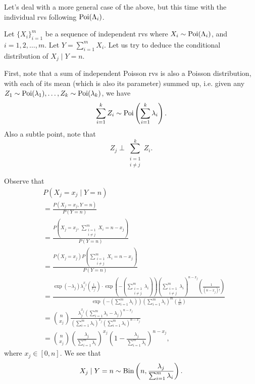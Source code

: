 \documentclass[notoc,notitlepage]{tufte-book}
\begin{document}
Let's deal with a more general case of the above, but this time with the
individual rvs following $\operatorname{Poi}(\Lambda_i)$.

\begin{eg}
  Let $\{X_i\}_{i=1}^{m}$ be a sequence of independent rvs where $X_i \sim
  \operatorname{Poi}(\Lambda_i)$, and $i = 1, 2, \ldots, m$. Let $Y = \sum_{i=1}^{m} X_i$. Let
  us try to deduce the conditional distribution of $X_j \mid Y = n$.

  First, note that a sum of independent Poisson rvs is also a Poisson
  distribution, with each of its mean (which is also its parameter) summed up,
  i.e. given any $Z_1 \sim \operatorname{Poi}(\lambda_1), \ldots, Z_k \sim \operatorname{Poi}(\lambda_k)$,
  we have
  \begin{equation*}
    \sum_{i=1}^{k} Z_i \sim \operatorname{Poi} \left( \sum_{i=1}^{k} \lambda_i \right).
  \end{equation*}
  Also a subtle point, note that
  \begin{equation*}
    Z_j \; \bot \; \sum_{\substack{i=1 \\ i \neq j}}^{k} Z_i.
  \end{equation*}
  
  Observe that
  \begin{align*}
    &P(X_j = x_j \mid Y = n) \\
    &= \frac{P(X_j = x_j, Y = n)}{P(Y = n)} \\
    &= \frac{P\left(X_j = x_j, \, \sum\limits_{\substack{i=1 \\ i \neq j}}^{m} X_i = n -
      x_j \right)}{P(Y = n)} \\
    &= \frac{P(X_j = x_j) P\left( \sum\limits_{\substack{i=1 \\ i \neq j}}^{m} X_i = n - x_j \right)}{P(Y = n)} \\
    &= \frac{\exp(-\lambda_j) \lambda_j^{x_j} \left( \frac{1}{x_j!} \right) \cdot
      \exp\left(-\left( \sum\limits_{\substack{i=1 \\ i \neq j}}^{m} \lambda_i \right)\right)
      \left( \sum\limits_{\substack{i=1 \\ i \neq j}}^{m} \lambda_i \right)^{n-x_j}
      \left( \frac{1}{(n - x_j)!} \right)}{\exp\left(-\left(
      \sum\limits_{i=1}^{m} \lambda_i \right)\right) \left( \sum\limits_{i=1}^{m}
      \lambda_i \right)^m \left( \frac{1}{n!} \right)} \\
    &= \binom{n}{x_j} \frac{\lambda_j^{x_j} \left( \sum\limits_{i=1}^{m}
      \lambda_i - \lambda_j \right)^{n - x_j}}{\left( \sum\limits_{i=1}^{m}
      \lambda_i \right)^{x_j} \left( \sum\limits_{i=1}^{m} \lambda_i
      \right)^{n-x_j}} \\
    &= \binom{n}{x_j} \left( \frac{\lambda_j}{\sum_{i=1}^{m} \lambda_i}
      \right)^{x_j} \left( 1 - \frac{\lambda_j}{\sum_{i=1}^{m} \lambda_i}
      \right)^{n-x_j},
  \end{align*}
  where $x_j \in [0, n]$. We see that
  \begin{equation*}
    X_j \mid Y = n \sim \operatorname{Bin} \left( n, \frac{\lambda_j}{\sum_{i=1}^{m}
    \lambda_i} \right).
  \end{equation*}
\end{eg}
\end{document}
